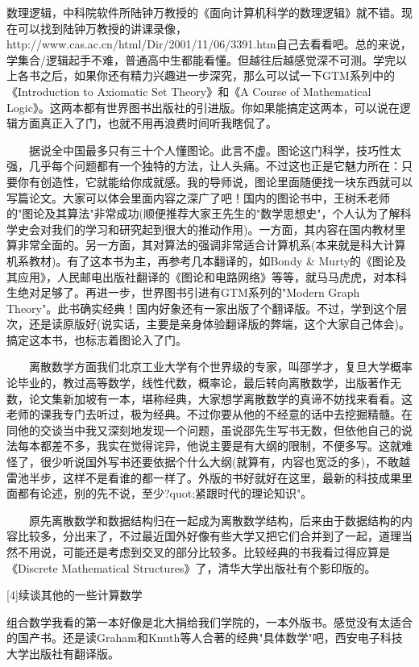 数理逻辑，中科院软件所陆钟万教授的《面向计算机科学的数理逻辑》就不错。现在可以找到陆钟万教授的讲课录像，http://www.cas.ac.cn/html/Dir/2001/11/06/3391.htm自己去看看吧。总的来说，学集合/逻辑起手不难，普通高中生都能看懂。但越往后越感觉深不可测。学完以上各书之后，如果你还有精力兴趣进一步深究，那么可以试一下GTM系列中的《Introduction to Axiomatic Set Theory》和《A Course of Mathematical Logic》。这两本都有世界图书出版社的引进版。你如果能搞定这两本，可以说在逻辑方面真正入了门，也就不用再浪费时间听我瞎侃了。 

　　据说全中国最多只有三十个人懂图论。此言不虚。图论这门科学，技巧性太强，几乎每个问题都有一个独特的方法，让人头痛。不过这也正是它魅力所在：只要你有创造性，它就能给你成就感。我的导师说，图论里面随便找一块东西就可以写篇论文。大家可以体会里面内容之深广了吧！国内的图论书中，王树禾老师的"图论及其算法"非常成功(顺便推荐大家王先生的"数学思想史"，个人认为了解科学史会对我们的学习和研究起到很大的推动作用)。一方面，其内容在国内教材里算非常全面的。另一方面，其对算法的强调非常适合计算机系(本来就是科大计算机系教材)。有了这本书为主，再参考几本翻译的，如Bondy \& Murty的《图论及其应用》，人民邮电出版社翻译的《图论和电路网络》等等，就马马虎虎，对本科生绝对足够了。再进一步，世界图书引进有GTM系列的"Modern Graph Theory"。此书确实经典！国内好象还有一家出版了个翻译版。不过，学到这个层次，还是读原版好(说实话，主要是亲身体验翻译版的弊端，这个大家自己体会)。搞定这本书，也标志着图论入了门。 

　　离散数学方面我们北京工业大学有个世界级的专家，叫邵学才，复旦大学概率论毕业的，教过高等数学，线性代数，概率论，最后转向离散数学，出版著作无数，论文集新加坡有一本，堪称经典，大家想学离散数学的真谛不妨找来看看。这老师的课我专门去听过，极为经典。不过你要从他的不经意的话中去挖掘精髓。在同他的交谈当中我又深刻地发现一个问题，虽说邵先生写书无数，但依他自己的说法每本都差不多，我实在觉得诧异，他说主要是有大纲的限制，不便多写。这就难怪了，很少听说国外写书还要依据个什么大纲(就算有，内容也宽泛的多)，不敢越雷池半步，这样不是看谁的都一样了。外版的书好就好在这里，最新的科技成果里面都有论述，别的先不说，至少?quot;紧跟时代的理论知识"。 

　　原先离散数学和数据结构归在一起成为离散数学结构，后来由于数据结构的内容比较多，分出来了，不过最近国外好像有些大学又把它们合并到了一起，道理当然不用说，可能还是考虑到交叉的部分比较多。比较经典的书我看过得应算是《Discrete Mathematical Structures》了，清华大学出版社有个影印版的。 

[4]续谈其他的一些计算数学 

组合数学我看的第一本好像是北大捐给我们学院的，一本外版书。感觉没有太适合的国产书。还是读Graham和Knuth等人合著的经典"具体数学"吧，西安电子科技大学出版社有翻译版。 

